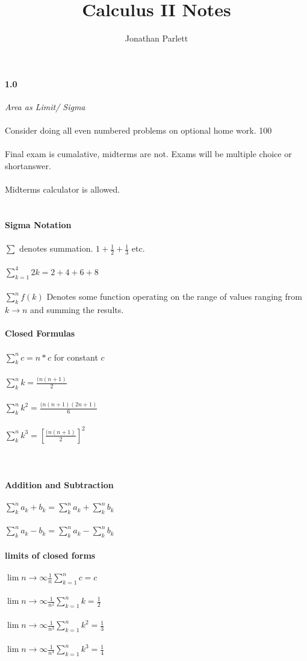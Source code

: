 \documentclass[14pt]{extreport}
\title{Calculus II Notes}
\author{Jonathan Parlett}
\begin{document}
\paragraph{1.0}
	\textit{Area as Limit/ Sigma}
\\\\
Consider doing all even numbered problems on
optional home work. 100%
\\\\
Final exam is cumalative, midterms are not. Exams will be multiple choice or shortanswer.
\\\\
Midterms calculator is allowed.
\\\\\\
\textbf{Sigma Notation}\\\\
$\sum$ denotes summation. $1 + \frac{1}{2}+\frac{1}{3}$ etc.
\\\\
$\sum_{k=1}^{4} 2k=2+4+6+8$
\\\\
$\sum_{k}^{n} f(k)$ Denotes some function operating on the range of values ranging from
$k \to n$ and summing the results.
\\\\
\textbf{Closed Formulas}
\\\\
$\sum_{k}^{n} c= n*c$ for constant $c$\\\\
$\sum_{k}^{n} k= \frac{(n(n+1)}{2}$\\\\
$\sum_{k}^{n} k^2= \frac{(n(n+1)(2n+1)}{6}$\\\\
$\sum_{k}^{n} k^3= [\frac{(n(n+1)}{2}]^2$\\\\
\\\\
\textbf{Addition and Subtraction}
\\\\
$\sum_{k}^{n} a_k+b_k=\sum_{k}^{n} a_k + \sum_{k}^{n} b_k$\\\\
$\sum_{k}^{n} a_k-b_k=\sum_{k}^{n} a_k - \sum_{k}^{n} b_k$\\\\

\textbf{limits of closed forms}\\\\
$\lim n \to \infty \frac{1}{n} \sum_{k=1}^{n} c = c$\\\\
$\lim n \to \infty \frac{1}{n^2} \sum_{k=1}^{n} k = \frac{1}{2}$\\\\
$\lim n \to \infty \frac{1}{n^3} \sum_{k=1}^{n} k^2 = \frac{1}{3}$\\\\
$\lim n \to \infty \frac{1}{n^4} \sum_{k=1}^{n} k^3 = \frac{1}{4}$\\\\
\end{document}
